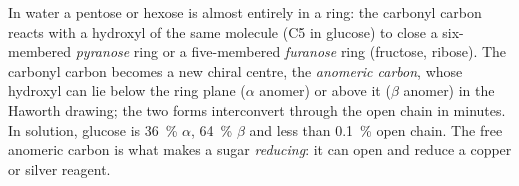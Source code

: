 \begin{proposition}\label{prop:b1:carbohydrates:rings}
In water a pentose or hexose is almost entirely in a ring: the carbonyl
carbon reacts with a hydroxyl of the same molecule (C5 in glucose) to
close a six-membered \emph{pyranose} ring or a five-membered
\emph{furanose} ring (fructose, ribose). The carbonyl carbon becomes a
new chiral centre, the \emph{anomeric carbon}, whose hydroxyl can lie
below the ring plane ($\alpha$ anomer) or above it ($\beta$ anomer) in
the Haworth drawing; the two forms interconvert through the open chain
in minutes. In solution, glucose is \qty{36}{\%} $\alpha$, \qty{64}{\%}
$\beta$ and less than \qty{0.1}{\%} open chain. The free anomeric
carbon is what makes a sugar \emph{reducing}: it can open and reduce a
copper or silver reagent.
\end{proposition}

